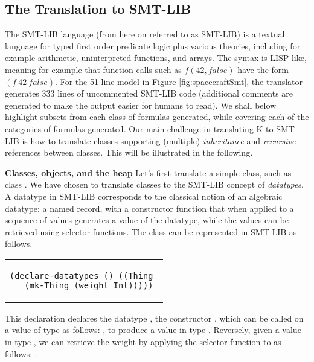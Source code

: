 \subsection{The Translation to SMT-LIB}

The SMT-LIB language (from here on referred to as SMT-LIB) is a textual
language for typed first order predicate logic plus various theories,
including for example arithmetic, uninterpreted functions, and
arrays. The syntax is LISP-like, meaning for example that function
calls such as $f(42,false)$ have the form $(f\ 42\ false)$. For the 51
line \Klang{} model in Figure \ref{fig:spacecraftSmt}, the translator
generates 333 lines of uncommented SMT-LIB code (additional comments
are generated to make the output easier for humans to read). We shall
below highlight subsets from each class of formulas generated, while
covering each of the categories of formulas generated. Our main
challenge in translating K to SMT-LIB is how to translate classes
supporting (multiple) {\em inheritance} and {\em recursive} references
between classes. This will be illustrated in the following.

\textbf{Classes, objects, and the heap} Let's first translate a simple
class, such as class .  We have chosen to translate
classes to the SMT-LIB concept of {\em datatypes}. A datatype in
SMT-LIB corresponds to the classical notion of an algebraic datatype:
a named record, with a constructor function that when applied to a
sequence of values generates a value of the datatype, while the values
can be retrieved using selector functions.  The class 
can be represented in SMT-LIB as follows.

\lstset{language=SMT,numbers=none}

\begin{center}
\begin{tabular}{c}
\small
\begin{lstlisting}
(declare-datatypes () ((Thing 
  (mk-Thing (weight Int)))))
\end{lstlisting}
\end{tabular}
\end{center}

\noindent This declaration declares the datatype , the
constructor , which can be called on a value 
of type  as follows: , to produce a
value in type . Reversely, given a value  in type
, we can retrieve the weight by applying the selector
function  to  as follows: .


